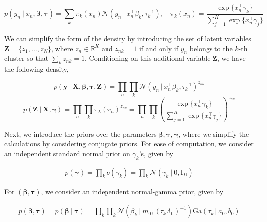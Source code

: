 \documentclass[twoside,11pt]{article}
\newcommand{\eye}{\mathrm{I}}
\newcommand\given[1][]{\:#1\vert\:}
\newcommand{\transpose}[1]{#1^{\intercal}}
\newcommand{\R}{\mathbb{R}}
\newcommand{\nprod}{\prod_{n}}
\newcommand{\kprod}{\prod_{k}}
\newcommand{\ksum}{\sum_{k}}
\newcommand{\boldbeta}{\boldsymbol\beta}
\newcommand{\boldgamma}{\boldsymbol\gamma}
\newcommand{\boldtau}{\boldsymbol\tau}
\newcommand{\sumexp}{\sum_{j=1}^{K} \exp \{ \transpose{x_n} \gamma_j \}}
\newcommand{\pr}[1]{p \left( #1 \right)}
\begin{document}
\begin{equation} \label{eq:mix_density}
	 \pr{y_n \given x_n, \boldbeta, \boldtau} = \ksum \pi_k(x_n) \mathcal{N} \left( y_n \given \transpose{x_n}\beta_k, \tau_k^{-1} \right), \quad \pi_k(x_n) = \frac{\exp\{\transpose{x_n} \gamma_k\}}{\sum\limits_{j=1}^{K} \exp\{ \transpose{x_n} \gamma_j\}}
\end{equation}

We can simplify the form of the density by introducing the set of latent variables $\mathbf{Z} = \{ z_1, \ldots, z_N \}$, where $z_n \in \R^K$ and $z_{nk} = 1$ if and only if $y_n$ belongs to the $k$-th cluster so that $\sum_{k} z_{nk} = 1$. Conditioning on this additional variable $\mathbf{Z}$, we have the following density, 


\begin{equation} \label{eq:simp_lik}
	p \left( \mathbf{y} \given \mathbf{X}, \boldsymbol\beta, \boldsymbol{\tau}, \mathbf{Z} \right) = 
	\prod_{n} \prod_{k} \mathcal{N} \left( y_n \given \transpose{x_n} \beta_k, \tau_{k}^{-1} \right)^{z_{nk}}
\end{equation}
\begin{equation} \label{eq:z_prior}
	p \left( \mathbf{Z} \given \mathbf{X}, \boldsymbol\gamma \right) = \nprod \kprod \pi_{k} (x_n)^{z_{nk}} = 
	\nprod \kprod \left( \frac{\exp\{\transpose{x_n} \gamma_k\}}{\sumexp}\right)^{z_{nk}}
\end{equation}

Next, we introduce the priors over the parameters $\boldbeta, \boldtau, \boldgamma$, where we simplify the calculations by considering conjugate priors. For ease of computation, we consider an independent standard normal prior on $\gamma_k$'s, given by

\begin{equation} \label{eq:gamma_prior}
\begin{split}
	 p(\boldgamma) = \kprod p(\gamma_k) = \kprod \mathcal{N} \left( \gamma_k \given 0, \eye_D \right)
\end{split}
\end{equation}

For $(\boldbeta, \boldtau)$, we consider an independent normal-gamma prior, given by

\begin{equation} \label{eq:betatau_prior}
\begin{split}
	 p\left( \boldbeta, \boldtau \right) = \pr{\boldbeta \given \boldtau} = \prod_{k} \kprod \mathcal{N} \left( \beta_k \given m_0, (\tau_k \Lambda_0)^{-1} \right) \mathrm{Ga} \left( \tau_k \given a_0, b_0 \right)
\end{split}
\end{equation}
\end{document}
